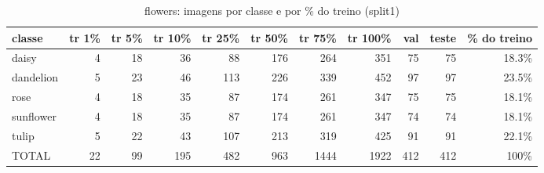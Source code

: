 \begin{table}[h]\centering\small
\caption{flowers: imagens por classe e por \% do treino (split1)}
\begin{tabular}{lrrrrrrrrrr}\toprule
classe & tr 1\% & tr 5\% & tr 10\% & tr 25\% & tr 50\% & tr 75\% & tr 100\% & val & teste & \% do treino \\\midrule
daisy & 4 & 18 & 36 & 88 & 176 & 264 & 351 & 75 & 75 & 18.3\% \\
dandelion & 5 & 23 & 46 & 113 & 226 & 339 & 452 & 97 & 97 & 23.5\% \\
rose & 4 & 18 & 35 & 87 & 174 & 261 & 347 & 75 & 75 & 18.1\% \\
sunflower & 4 & 18 & 35 & 87 & 174 & 261 & 347 & 74 & 74 & 18.1\% \\
tulip & 5 & 22 & 43 & 107 & 213 & 319 & 425 & 91 & 91 & 22.1\% \\
\midrule TOTAL & 22 & 99 & 195 & 482 & 963 & 1444 & 1922 & 412 & 412 & 100\% \\\bottomrule
\end{tabular}\end{table}
